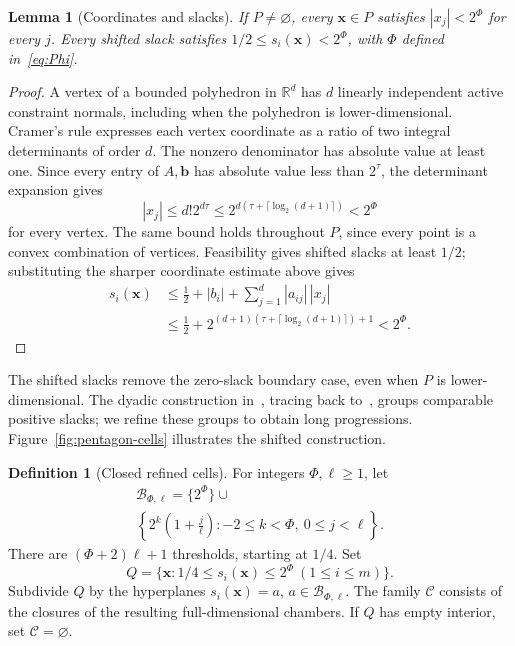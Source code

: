 \documentclass[11pt]{article}
\newtheorem{lemma}[theorem]{Lemma}
\theoremstyle{definition}\newtheorem{definition}{Definition}[section]
\theoremstyle{remark}\newtheorem{remark}[theorem]{Remark}
\newcommand{\R}{\mathbb R}\newcommand{\Q}{\mathbb Q}\newcommand{\Z}{\mathbb Z}
\begin{document}
\begin{lemma}[Coordinates and slacks]\label{lem:size}
If $P\ne\varnothing$, every $\mathbf{x}\in P$ satisfies $|x_j|<2^\Phi$ for every $j$. Every shifted slack satisfies $1/2\le s_i(\mathbf{x})<2^\Phi$, with $\Phi$ defined in~\eqref{eq:Phi}.
\end{lemma}
\begin{proof}
A vertex of a bounded polyhedron in $\R^d$ has $d$ linearly independent active constraint normals, including when the polyhedron is lower-dimensional. Cramer's rule expresses each vertex coordinate as a ratio of two integral determinants of order $d$. The nonzero denominator has absolute value at least one. Since every entry of $A,\mathbf{b}$ has absolute value less than $2^\tau$, the determinant expansion gives
\[
 |x_j|\le d!2^{d\tau}
 \le 2^{d(\tau+\lceil\log_2(d+1)\rceil)}<2^\Phi
\]
for every vertex. The same bound holds throughout $P$, since every point is a convex combination of vertices. Feasibility gives shifted slacks at least $1/2$; substituting the sharper coordinate estimate above gives
\[
\begin{aligned}
 s_i(\mathbf{x})&\le\tfrac12+ |b_i|+\sum_{j=1}^d|a_{ij}|\,|x_j|\\
 &\le\tfrac12+ 2^{(d+1)(\tau+\lceil\log_2(d+1)\rceil)+1}<2^\Phi.
\end{aligned}
\]
\end{proof}

The shifted slacks remove the zero-slack boundary case, even when $P$ is lower-dimensional. The dyadic construction in~\cite[Theorem~2.2]{AH}, tracing back to~\cite{CHKM}, groups comparable positive slacks; we refine these groups to obtain long progressions. Figure~\ref{fig:pentagon-cells} illustrates the shifted construction.

\begin{definition}[Closed refined cells]\label{def:thresholds}
For integers $\Phi,\ell\ge1$, let
\begin{equation}\label{eq:thresholds}
\begin{split}
\mathcal B_{\Phi,\ell}=\{2^\Phi\}\cup\\
 \left\{2^k\left(1+\frac j\ell\right):-2\le k<\Phi,\ 0\le j<\ell\right\}.
\end{split}
\end{equation}
There are $(\Phi+2)\ell+1$ thresholds, starting at $1/4$. Set
\[
 Q=\{\mathbf{x}:1/4\le s_i(\mathbf{x})\le2^\Phi\ (1\le i\le m)\}.
\]
Subdivide $Q$ by the hyperplanes $s_i(\mathbf{x})=a$, $a\in\mathcal B_{\Phi,\ell}$. The family $\mathcal C$ consists of the closures of the resulting full-dimensional chambers. If $Q$ has empty interior, set $\mathcal C=\varnothing$.
\end{definition}
\end{document}
